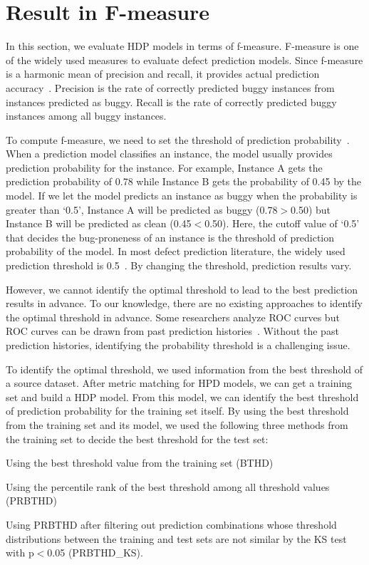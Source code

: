 \section{Result in F-measure}
In this section, we evaluate HDP models in terms of f-measure. F-measure is one of the widely used measures to evaluate defect prediction models. Since f-measure is a harmonic mean of precision and recall, it provides actual prediction accuracy~\cite{Lee11,Rahman13,Fukushima14,Herzig13,Jing14}. Precision is the rate of correctly predicted buggy instances from instances predicted as buggy. Recall is the rate of correctly predicted buggy instances among all buggy instances.

To compute f-measure, we need to set the threshold of prediction probability~\cite{Lessmann08,Rahman12}. When a prediction model classifies an instance, the model usually provides prediction probability for the instance. For example, Instance A gets the prediction probability of 0.78 while Instance B gets the probability of 0.45 by the model. If we let the model predicts an instance as buggy when the probability is greater than `0.5', Instance A will be predicted as buggy (0.78$>$0.50) but Instance B will be predicted as clean (0.45$<$0.50). Here, the cutoff value of `0.5' that decides the bug-proneness of an instance is the threshold of prediction probability of the model. In most defect prediction literature, the widely used prediction threshold is 0.5~\cite{Lee11,Rahman13,Herzig13,Zimmermann09}. By changing the threshold, prediction results vary.

However, we cannot identify the optimal threshold to lead to the best prediction results in advance. To our knowledge, there are no existing approaches to identify the optimal threshold in advance. Some researchers analyze ROC curves but ROC curves can be drawn from past prediction histories~\cite{Fawcett06,Tosun09}. Without the past prediction histories, identifying the probability threshold is a challenging issue.

To identify the optimal threshold, we used information from the best threshold of a source dataset. After metric matching for HPD models, we can get a training set and build a HDP model. From this model, we can identify the best threshold of prediction probability for the training set itself. By using the best threshold from the training set and its model, we used the following three methods from the training set to decide the best threshold for the test set:
\squishlist
\item Using the best threshold value from the training set (BTHD)
\item Using the percentile rank of the best threshold among all threshold values (PRBTHD)
\item Using PRBTHD after filtering out prediction combinations whose threshold distributions between the training and test sets are not similar by the KS test with p$<$0.05 (PRBTHD\_KS).
\squishend


